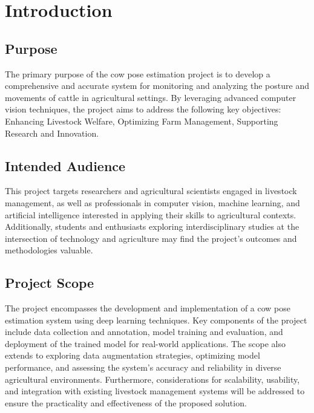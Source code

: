 \chapter{Introduction}
\section{Purpose}
The primary purpose of the cow pose estimation project is to develop a comprehensive and accurate system for monitoring and analyzing the posture and movements of cattle in agricultural settings. By leveraging advanced computer vision techniques, the project aims to address the following key objectives: Enhancing Livestock Welfare, Optimizing Farm Management, Supporting Research and Innovation.
\section{Intended Audience}
This project targets researchers and agricultural scientists engaged in livestock management, as well as professionals in computer vision, machine learning, and artificial intelligence interested in applying their skills to agricultural contexts. Additionally, students and enthusiasts exploring interdisciplinary studies at the intersection of technology and agriculture may find the project's outcomes and methodologies valuable.
\section{Project Scope}
The project encompasses the development and implementation of a cow pose estimation system using deep learning techniques. Key components of the project include data collection and annotation, model training and evaluation, and deployment of the trained model for real-world applications. The scope also extends to exploring data augmentation strategies, optimizing model performance, and assessing the system's accuracy and reliability in diverse agricultural environments. Furthermore, considerations for scalability, usability, and integration with existing livestock management systems will be addressed to ensure the practicality and effectiveness of the proposed solution.
